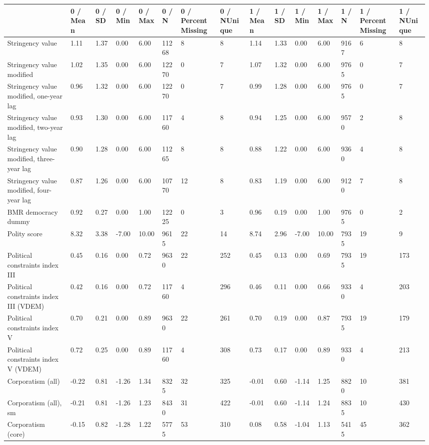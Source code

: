 
\begin{longtable}{lllllllllllllll}
\toprule
  & 0 / Mean & 0 / SD & 0 / Min & 0 / Max & 0 / N & 0 / PercentMissing & 0 / NUnique & 1 / Mean & 1 / SD & 1 / Min & 1 / Max & 1 / N & 1 / PercentMissing & 1 / NUnique\\
\midrule
Stringency value & 1.11 & 1.37 & 0.00 & 6.00 & 11268 & 8 & 8 & 1.14 & 1.33 & 0.00 & 6.00 & 9167 & 6 & 8\\
Stringency value modified & 1.02 & 1.35 & 0.00 & 6.00 & 12270 & 0 & 7 & 1.07 & 1.32 & 0.00 & 6.00 & 9765 & 0 & 7\\
Stringency value modified, one-year lag & 0.96 & 1.32 & 0.00 & 6.00 & 12270 & 0 & 7 & 0.99 & 1.28 & 0.00 & 6.00 & 9765 & 0 & 7\\
Stringency value modified, two-year lag & 0.93 & 1.30 & 0.00 & 6.00 & 11760 & 4 & 8 & 0.94 & 1.25 & 0.00 & 6.00 & 9570 & 2 & 8\\
Stringency value modified, three-year lag & 0.90 & 1.28 & 0.00 & 6.00 & 11265 & 8 & 8 & 0.88 & 1.22 & 0.00 & 6.00 & 9360 & 4 & 8\\
\addlinespace
Stringency value modified, four-year lag & 0.87 & 1.26 & 0.00 & 6.00 & 10770 & 12 & 8 & 0.83 & 1.19 & 0.00 & 6.00 & 9120 & 7 & 8\\
BMR democracy dummy & 0.92 & 0.27 & 0.00 & 1.00 & 12225 & 0 & 3 & 0.96 & 0.19 & 0.00 & 1.00 & 9765 & 0 & 2\\
Polity score & 8.32 & 3.38 & -7.00 & 10.00 & 9615 & 22 & 14 & 8.74 & 2.96 & -7.00 & 10.00 & 7935 & 19 & 9\\
Political constraints index III & 0.45 & 0.16 & 0.00 & 0.72 & 9630 & 22 & 252 & 0.45 & 0.13 & 0.00 & 0.69 & 7935 & 19 & 173\\
Political constraints index III (VDEM) & 0.42 & 0.16 & 0.00 & 0.72 & 11760 & 4 & 296 & 0.46 & 0.11 & 0.00 & 0.66 & 9330 & 4 & 203\\
\addlinespace
Political constraints index V & 0.70 & 0.21 & 0.00 & 0.89 & 9630 & 22 & 261 & 0.70 & 0.19 & 0.00 & 0.87 & 7935 & 19 & 179\\
Political constraints index V (VDEM) & 0.72 & 0.25 & 0.00 & 0.89 & 11760 & 4 & 308 & 0.73 & 0.17 & 0.00 & 0.89 & 9330 & 4 & 213\\
Corporatism (all) & -0.22 & 0.81 & -1.26 & 1.34 & 8325 & 32 & 325 & -0.01 & 0.60 & -1.14 & 1.25 & 8820 & 10 & 381\\
Corporatism (all), sm & -0.21 & 0.81 & -1.26 & 1.23 & 8430 & 31 & 422 & -0.01 & 0.60 & -1.14 & 1.24 & 8835 & 10 & 430\\
Corporatism (core) & -0.15 & 0.82 & -1.28 & 1.22 & 5775 & 53 & 310 & 0.08 & 0.58 & -1.04 & 1.13 & 5415 & 45 & 362\\

\end{longtable}
